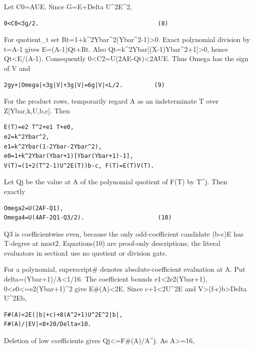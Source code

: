 Let C0=AUE. Since G=E+Delta U\^{}2E\^{}2,

\begin{verbatim}
0<C0<3g/2.                                  (8)
\end{verbatim}

For quotient\_t set Rt=1+k\^{}2Ybar\^{}2(Ybar\^{}2-1)\textgreater0.
Exact polynomial division by t=A-1 gives E=(A-1)Qt+Rt. Also
Qt=k\^{}2Ybar{[}(X-1)Ybar\^{}2+1{]}\textgreater0, hence
Qt\textless E/(A-1). Consequently 0\textless C2=U(2AE-Qt)\textless2AUE.
Thus Omega has the sign of V and

\begin{verbatim}
2gy+|Omega|<3g|V|+3g|V|=6g|V|<L/2.         (9)
\end{verbatim}

For the product rows, temporarily regard A as an indeterminate T over
Z{[}Ybar,k,U,b,c{]}. Then

\begin{verbatim}
E(T)=e2 T^2+e1 T+e0,
e2=k^2Ybar^2,
e1=k^2Ybar(1-2Ybar-2Ybar^2),
e0=1+k^2Ybar(Ybar+1)[Ybar(Ybar+1)-1],
V(T)=(1+2(T^2-1)U^2E(T))b-c, F(T)=E(T)V(T).
\end{verbatim}

Let Qj be the value at A of the polynomial quotient of F(T) by T\^{}j.
Then exactly

\begin{verbatim}
Omega2=U(2AF-Q1),
Omega4=U(4AF-2Q1-Q3/2).                     (10)
\end{verbatim}

Q3 is coefficientwise even, because the only odd-coefficient candidate
(b-c)E has T-degree at most2. Equations(10) are proof-only descriptions;
the literal evaluators in section1 use no quotient or division gate.

For a polynomial, superscript\# denotes absolute-coefficient evaluation
at A. Put delta=(Ybar+1)/A\textless1/16. The coefficient bounds
\textbar e1\textbar\textless2e2(Ybar+1),
0\textless e0\textless=e2(Ybar+1)\^{}2 give E\#(A)\textless2E. Since
c+1\textless2U\^{}2E and
\textbar V\textbar\textgreater(f-c)\textbar b\textbar\textgreater Delta
U\^{}2E\textbar b\textbar,

\begin{verbatim}
F#(A)<2E(|b|+c)+8(A^2+1)U^2E^2|b|,
F#(A)/|EV|<8+20/Delta<10.
\end{verbatim}

Deletion of low coefficients gives
\textbar Qj\textbar\textless=F\#(A)/A\^{}j. As A\textgreater=16,

